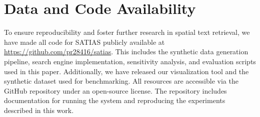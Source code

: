 \documentclass[manuscript,screen]{acmart}
\begin{document}
\section{Data and Code Availability}
To ensure reproducibility and foster further research in spatial text retrieval, we have made all code for SATIAS publicly available at \url{https://github.com/pr28416/satias}. This includes the synthetic data generation pipeline, search engine implementation, sensitivity analysis, and evaluation scripts used in this paper. Additionally, we have released our visualization tool and the synthetic dataset used for benchmarking. All resources are accessible via the GitHub repository under an open-source license. The repository includes documentation for running the system and reproducing the experiments described in this work.

\begin{acks}

\end{acks}



\end{document}
